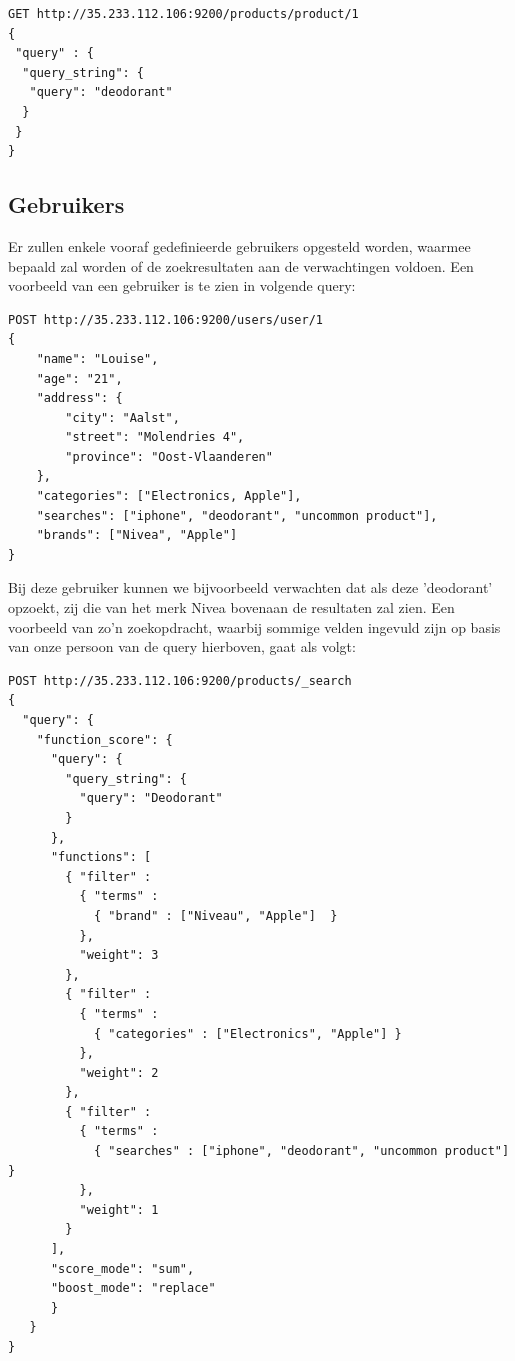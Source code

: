 \begin{lstlisting}[caption={Query om één enkel product op te halen},captionpos=b]
GET http://35.233.112.106:9200/products/product/1 
{
 "query" : {
  "query_string": {
   "query": "deodorant"
  }
 }
}
\end{lstlisting}

\subsection{Gebruikers}

Er zullen enkele vooraf gedefinieerde gebruikers opgesteld worden, waarmee bepaald zal worden of de zoekresultaten aan de verwachtingen voldoen. Een voorbeeld van een gebruiker is te zien in volgende query:
\begin{lstlisting}[caption={Query om één enkele gebruiker aan te maken}]
POST http://35.233.112.106:9200/users/user/1
{
	"name": "Louise",
	"age": "21",
	"address": {
		"city": "Aalst",
		"street": "Molendries 4",
		"province": "Oost-Vlaanderen"
	},
	"categories": ["Electronics, Apple"],
	"searches": ["iphone", "deodorant", "uncommon product"],
	"brands": ["Nivea", "Apple"]
}
\end{lstlisting}

Bij deze gebruiker kunnen we bijvoorbeeld verwachten dat als deze 'deodorant' opzoekt, zij die van het merk Nivea bovenaan de resultaten zal zien. Een voorbeeld van zo'n zoekopdracht, waarbij sommige velden ingevuld zijn op basis van onze persoon van de query hierboven, gaat als volgt:

\begin{lstlisting}[caption={Query om een zoekopdracht met term 'Deodorant' uit te voeren, met filters en een score op basis van informatie van een gebruiker}]
POST http://35.233.112.106:9200/products/_search
{
  "query": {
    "function_score": {
      "query": {
        "query_string": {
          "query": "Deodorant"
        }
      },
      "functions": [
        { "filter" : 
          { "terms" : 
            { "brand" : ["Niveau", "Apple"]  } 
          },
          "weight": 3
        },
        { "filter" : 
          { "terms" : 
            { "categories" : ["Electronics", "Apple"] }
          },
          "weight": 2
        },
        { "filter" : 
          { "terms" : 
            { "searches" : ["iphone", "deodorant", "uncommon product"] } 
          },
          "weight": 1
        }
      ],
      "score_mode": "sum",
      "boost_mode": "replace"
      }
   }
}
\end{lstlisting}

